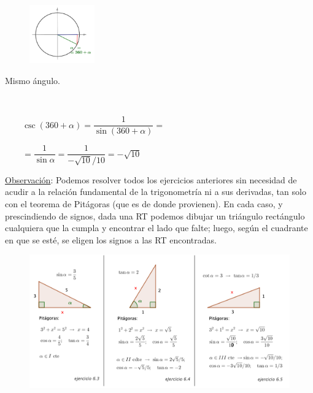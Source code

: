 \begin{miejercicio}
\begin{multicols}{2}

\begin{figure}[H]
	\centering
	\includegraphics[width=0.25\textwidth]{img-rt/rt22.png}
	\end{figure}
Mismo ángulo.

$\quad$

$\qquad \csc (360+\alpha)=\dfrac{1}{\sin (360+\alpha)}=$

$\qquad =\dfrac {1}{\sin \alpha } = \dfrac {1}{-\sqrt{10}/10}=-\sqrt{10}$
		
\end{multicols}

\end{miejercicio}

\vspace{3mm}

\begin{small} \underline{Observación}: Podemos resolver todos los ejercicios anteriores sin necesidad de acudir a la relación fundamental de la trigonometría ni a sus derivadas, tan solo con el teorema de Pitágoras (que es de donde provienen). En cada caso, y prescindiendo de signos, dada una RT podemos dibujar un triángulo rectángulo cualquiera que la cumpla y encontrar el lado que falte; luego, según el cuadrante en que se esté, se eligen los signos a las RT encontradas.\end{small}

\begin{figure}[H]
	\centering
	\includegraphics[width=1\textwidth]{img-rt/rt23.png}
\end{figure}

